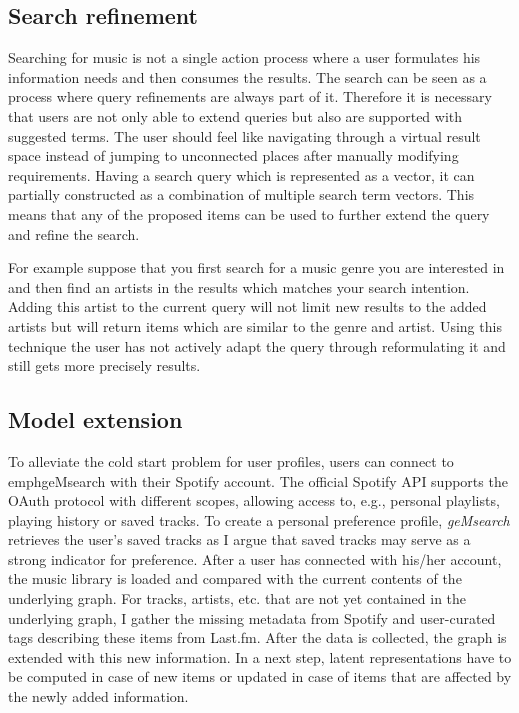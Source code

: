 \documentclass[sigconf]{acmart}
\begin{document}
	\subsection{Search refinement}
	
	Searching for music is not a single action process where a user formulates his information needs and then consumes the results. The search can be seen as a process where query refinements are always part of it. Therefore it is necessary that users are not only able to extend queries but also are supported with suggested terms. The user should feel like navigating through a virtual result space instead of jumping to unconnected places after manually modifying requirements. Having a search query which is represented as a vector, it can partially constructed as a combination of multiple search term vectors. This means that any of the proposed items can be used to further extend the query and refine the search.
	
	For example suppose that you first search for a music genre you are interested in and then find an artists in the results which matches your search intention. Adding this artist to the current query will not limit new results to the added artists but will return items which are similar to the genre and artist. Using this technique the user has not actively adapt the query through reformulating it and still gets more precisely results. \\
\fi



\subsection{Model extension}
\label{sec:model_extension}

To alleviate the cold start problem for user profiles, users can connect to emph{geMsearch} with their Spotify account. The official Spotify API supports the OAuth protocol with different scopes, allowing access to, e.g., personal playlists, playing history or saved tracks. To create a personal preference profile, \emph{geMsearch} retrieves the user's saved tracks as I argue that saved tracks may serve as a strong indicator for preference. %
After a user has connected with his/her account, the music library is loaded and compared with the current contents of the underlying graph. For tracks, artists, etc. that are not yet contained in the underlying graph, I gather the missing metadata from Spotify and user-curated tags describing these items from Last.fm. After the data is collected, the graph is extended with this new information. In a next step, latent representations have to be computed in case of new items or updated in case of items that are affected by the newly added information.
\end{document}
